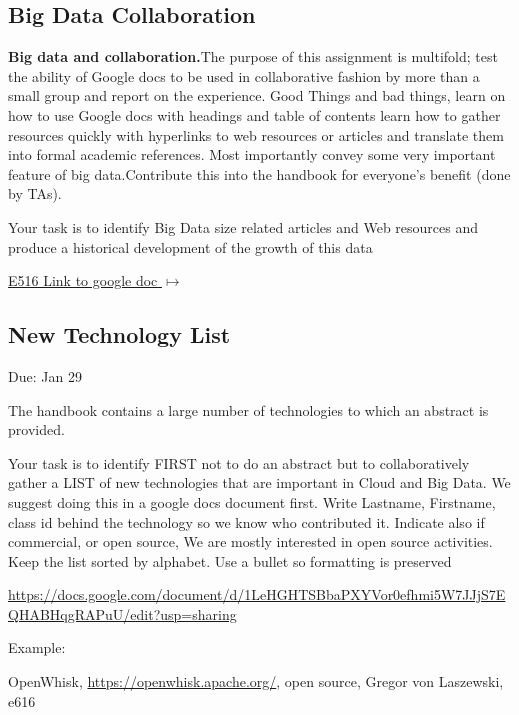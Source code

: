 \subsection{Big Data Collaboration}
\label{E:616-bigdata-collab}

\begin{exercise} \label{E:616-big-data-and-collaboration} {\bf Big
    data and collaboration.}The purpose of this assignment is
  multifold; test the ability of Google docs to be used in
  collaborative fashion by more than a small group and report on the
  experience. Good Things and bad things, learn on how to use Google
  docs with headings and table of contents learn how to gather
  resources quickly with hyperlinks to web resources or articles and
  translate them into formal academic references. Most importantly
  convey some very important feature of big data.Contribute this into
  the handbook for everyone's benefit (done by TAs).  \smallskip

   Your task is to identify Big Data size related
  articles and Web resources and produce a historical development of
  the growth of this data

  {\hfill \href{https://docs.google.com/document/d/1ZHNdhX_Jx7uBQo0kthSYQ6TQR8_KNbgOwH2EuqBQcjY/edit?usp=sharing}{E516 Link to google doc $\mapsto$}}



\end{exercise}



\subsection{New Technology List}
\label{E:616-new-tech}

\begin{exercise} 
Due: Jan 29

The handbook contains a large number of technologies to which an
abstract is provided.

Your task is to identify FIRST not to do an abstract but to
collaboratively gather a LIST of new technologies that are important
in Cloud and Big Data. We suggest doing this in a google docs document
first. Write Lastname, Firstname, class id behind the technology so we
know who contributed it. Indicate also if commercial, or open source,
We are mostly interested in open source activities. Keep the list
sorted by alphabet. Use a bullet so formatting is preserved

\url{https://docs.google.com/document/d/1LeHGHTSBbaPXYVor0efhmi5W7JJjS7EQHABHqgRAPuU/edit?usp=sharing}

Example: 

OpenWhisk, \url{https://openwhisk.apache.org/}, open source, Gregor von Laszewski, e616

\end{exercise}


